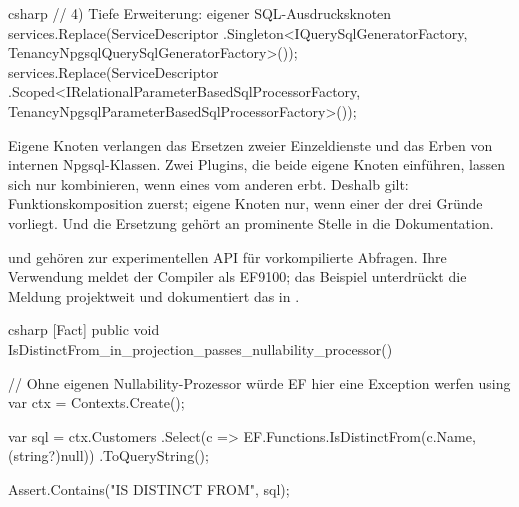 \begin{sourcecode}{csharp}
// 4) Tiefe Erweiterung: eigener SQL-Ausdrucksknoten
services.Replace(ServiceDescriptor
    .Singleton<IQuerySqlGeneratorFactory, TenancyNpgsqlQuerySqlGeneratorFactory>());
services.Replace(ServiceDescriptor
    .Scoped<IRelationalParameterBasedSqlProcessorFactory,
        TenancyNpgsqlParameterBasedSqlProcessorFactory>());
\end{sourcecode}

\begin{important}
  Eigene Knoten verlangen das Ersetzen zweier Einzeldienste und das Erben von internen
  Npgsql-Klassen. Zwei Plugins, die beide eigene Knoten einführen, lassen sich nur
  kombinieren, wenn eines vom anderen erbt. Deshalb gilt: Funktionskomposition zuerst;
  eigene Knoten nur, wenn einer der drei Gründe vorliegt. Und die Ersetzung gehört an
  prominente Stelle in die Dokumentation.
\end{important}

\begin{note}
   und
   gehören
  zur experimentellen API für vorkompilierte Abfragen. Ihre Verwendung meldet der Compiler
  als EF9100; das Beispiel unterdrückt die Meldung projektweit und dokumentiert das in
  .
\end{note}

\begin{sourcecode}{csharp}
[Fact]
public void IsDistinctFrom_in_projection_passes_nullability_processor()
{
    // Ohne eigenen Nullability-Prozessor würde EF hier eine Exception werfen
    using var ctx = Contexts.Create();

    var sql = ctx.Customers
        .Select(c => EF.Functions.IsDistinctFrom(c.Name, (string?)null))
        .ToQueryString();

    Assert.Contains("IS DISTINCT FROM", sql);
}
\end{sourcecode}

